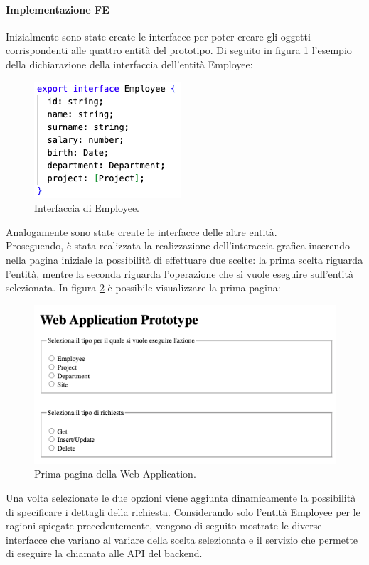 \paragraph{Implementazione FE}
Inizialmente sono state create le interfacce per poter creare gli oggetti corrispondenti alle quattro entità del prototipo. Di seguito in figura \ref{employee-interface} l'esempio della dichiarazione della interfaccia dell'entità Employee:
\FloatBarrier
\begin{figure}[!ht]
\centering
\includegraphics[width=0.3\linewidth]{immagini/employeeInterface.png}
\caption{Interfaccia di Employee.}
\label{employee-interface}
\end{figure}
\FloatBarrier
Analogamente sono state create le interfacce delle altre entità.\\
Proseguendo, è stata realizzata la realizzazione dell'interaccia grafica inserendo nella pagina iniziale la possibilità di effettuare due scelte: la prima scelta riguarda l'entità, mentre la seconda riguarda l'operazione che si vuole eseguire sull'entità selezionata. In figura \ref{first-page} è possibile visualizzare la prima pagina:
\FloatBarrier
\begin{figure}[!ht]
\centering
\includegraphics[width=0.7\linewidth]{immagini/firstPage.png}
\caption{Prima pagina della Web Application.}
\label{first-page}
\end{figure}
\FloatBarrier
Una volta selezionate le due opzioni viene aggiunta dinamicamente la possibilità di specificare i dettagli della richiesta. Considerando solo l'entità Employee per le ragioni spiegate precedentemente, vengono di seguito mostrate le diverse interfacce che variano al variare della scelta selezionata e il servizio che permette di eseguire la chiamata alle API del backend.\\
